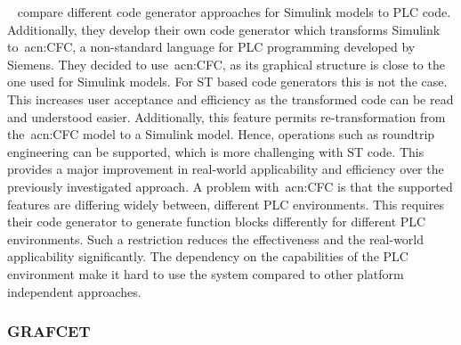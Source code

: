 \citeauthor{6489667}~\cite{6489667} compare different code generator approaches for Simulink models to PLC code.
Additionally, they develop their own code generator which transforms Simulink to~\acrfull{acn:CFC}, a non-standard language for PLC programming developed by Siemens.
They decided to use~\acrshort{acn:CFC}, as its graphical structure is close to the one used for Simulink models.
For ST based code generators this is not the case.
This increases user acceptance and efficiency as the transformed code can be read and understood easier.
Additionally, this feature permits re-transformation from the~\acrshort{acn:CFC} model to a Simulink model.
Hence, operations such as roundtrip engineering can be supported, which is more challenging with ST code.
This provides a major improvement in real-world applicability and efficiency over the previously investigated approach.
A problem with~\acrshort{acn:CFC} is that the supported features are differing widely between, different PLC environments.
This requires their code generator to generate function blocks differently for different PLC environments.
Such a restriction reduces the effectiveness and the real-world applicability significantly.
The dependency on the capabilities of the PLC environment make it hard to use the system compared to other platform independent approaches.

\subsubsection{GRAFCET}
\label{sec:sub:grafcet}


